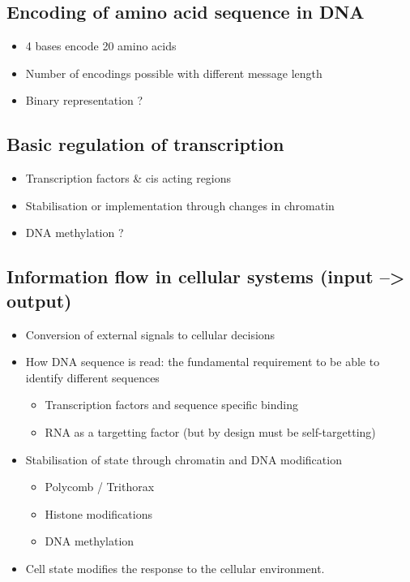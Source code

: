 \documentclass{scrartcl}
\begin{document}
\subsection{Encoding of amino acid sequence in DNA}
\label{sec-2-3}

\begin{itemize}
\item 4 bases encode 20 amino acids
\item Number of encodings possible with different message length
\item Binary representation ?
\end{itemize}
\subsection{Basic regulation of transcription}
\label{sec-2-4}

\begin{itemize}
\item Transcription factors \& cis acting regions
\item Stabilisation or implementation through changes in chromatin
\item DNA methylation ?
\end{itemize}
\subsection{Information flow in cellular systems (input --> output)}
\label{sec-2-5}

\begin{itemize}
\item Conversion of external signals to cellular decisions
\item How DNA sequence is read: the fundamental requirement to
  be able to identify different sequences
\begin{itemize}
\item Transcription factors and sequence specific binding
\item RNA as a targetting factor (but by design must be self-targetting)
\end{itemize}
\item Stabilisation of state through chromatin and DNA modification
\begin{itemize}
\item Polycomb / Trithorax
\item Histone modifications
\item DNA methylation
\end{itemize}
\item Cell state modifies the response to the cellular environment.
\end{itemize}
\end{document}
